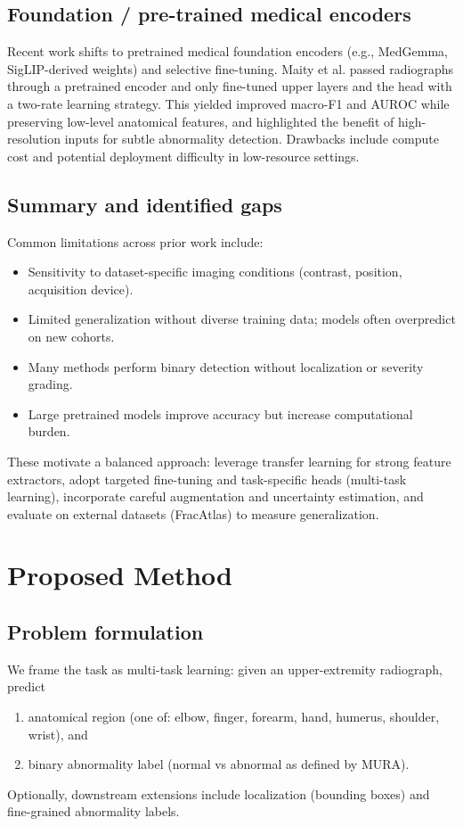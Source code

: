 \documentclass[conference]{IEEEtran}
\begin{document}
\subsection{Foundation / pre-trained medical encoders}
Recent work shifts to pretrained medical foundation encoders (e.g., MedGemma, SigLIP-derived weights) and selective fine-tuning. Maity et al. \cite{ref11} passed radiographs through a pretrained encoder and only fine-tuned upper layers and the head with a two-rate learning strategy. This yielded improved macro-F1 and AUROC while preserving low-level anatomical features, and highlighted the benefit of high-resolution inputs for subtle abnormality detection. Drawbacks include compute cost and potential deployment difficulty in low-resource settings.

\subsection{Summary and identified gaps}
Common limitations across prior work include:
\begin{itemize}
  \item Sensitivity to dataset-specific imaging conditions (contrast, position, acquisition device).
  \item Limited generalization without diverse training data; models often overpredict on new cohorts.
  \item Many methods perform binary detection without localization or severity grading.
  \item Large pretrained models improve accuracy but increase computational burden.
\end{itemize}
These motivate a balanced approach: leverage transfer learning for strong feature extractors, adopt targeted fine-tuning and task-specific heads (multi-task learning), incorporate careful augmentation and uncertainty estimation, and evaluate on external datasets (FracAtlas) to measure generalization.

\section{Proposed Method}
\subsection{Problem formulation}
We frame the task as multi-task learning: given an upper-extremity radiograph, predict
\begin{enumerate}
  \item anatomical region (one of: elbow, finger, forearm, hand, humerus, shoulder, wrist), and
  \item binary abnormality label (normal vs abnormal as defined by MURA).
\end{enumerate}
Optionally, downstream extensions include localization (bounding boxes) and fine-grained abnormality labels.
\end{document}
